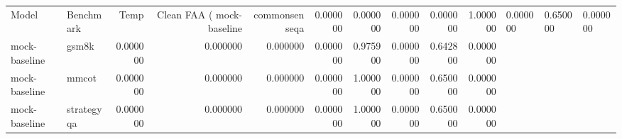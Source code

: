 \begin{tabular}{llrrrrrrrr}
\toprule
Model & Benchmark & Temp & Clean FAA (%
\midrule
mock-baseline & commonsenseqa & 0.000000 & 0.000000 & 0.000000 & 0.000000 & 1.000000 & 0.000000 & 0.650000 & 0.000000 \\
mock-baseline & gsm8k & 0.000000 & 0.000000 & 0.000000 & 0.000000 & 0.975900 & 0.000000 & 0.642800 & 0.000000 \\
mock-baseline & mmcot & 0.000000 & 0.000000 & 0.000000 & 0.000000 & 1.000000 & 0.000000 & 0.650000 & 0.000000 \\
mock-baseline & strategyqa & 0.000000 & 0.000000 & 0.000000 & 0.000000 & 1.000000 & 0.000000 & 0.650000 & 0.000000 \\
\bottomrule
\end{tabular}
